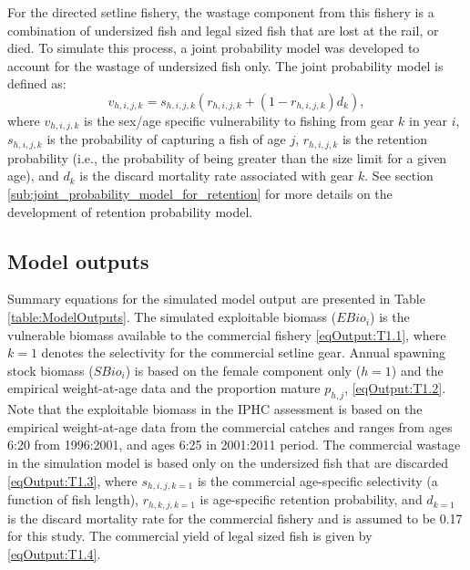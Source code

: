 For the directed setline fishery, the wastage component from this fishery is a combination of undersized fish and legal sized fish that are lost at the rail, or died.  To simulate this process, a joint probability model was developed to account for the wastage of undersized fish only. The joint probability model is defined as:
\[
 v_{h,i,j,k} = s_{h,i,j,k}(r_{h,i,j,k}+(1-r_{h,i,j,k})d_{k}),
\]
where $v_{h,i,j,k}$ is the sex/age specific vulnerability to fishing from gear $k$ in year $i$, $s_{h,i,j,k}$ is the probability of capturing a fish of age $j$, $r_{h,i,j,k}$ is the retention probability (i.e., the probability of being greater than the size limit for a given age), and $d_{k}$ is the discard mortality rate associated with gear $k$.  See section \ref{sub:joint_probability_model_for_retention} for more details on the development of retention probability model.

\subsection{Model outputs} %
\label{sub:model_outputs}

Summary equations for the simulated model output are presented in Table \ref{table:ModelOutputs}.  The simulated exploitable biomass ($EBio_i$) is the vulnerable biomass available to the commercial fishery \eqref{eqOutput:T1.1}, where $k=1$ denotes the selectivity for the commercial setline gear.  Annual spawning stock biomass ($SBio_i$) is based on the female component only ($h=1$) and the empirical weight-at-age data and the proportion mature $p_{h,j}$, \eqref{eqOutput:T1.2}.  Note that the exploitable biomass  in the IPHC assessment is based on the empirical weight-at-age data from the commercial catches and ranges from ages 6:20 from 1996:2001, and ages 6:25 in 2001:2011 period.  The commercial wastage in the simulation model is based only on the undersized fish that are discarded \eqref{eqOutput:T1.3}, where $s_{h,i,j,k=1}$ is the commercial age-specific selectivity (a function of fish length), $r_{h,k,j,k=1}$ is age-specific retention probability, and $d_{k=1}$ is the discard mortality rate for the commercial fishery and is assumed to be 0.17 for this study.  The commercial yield of legal sized fish is given by \eqref{eqOutput:T1.4}.


